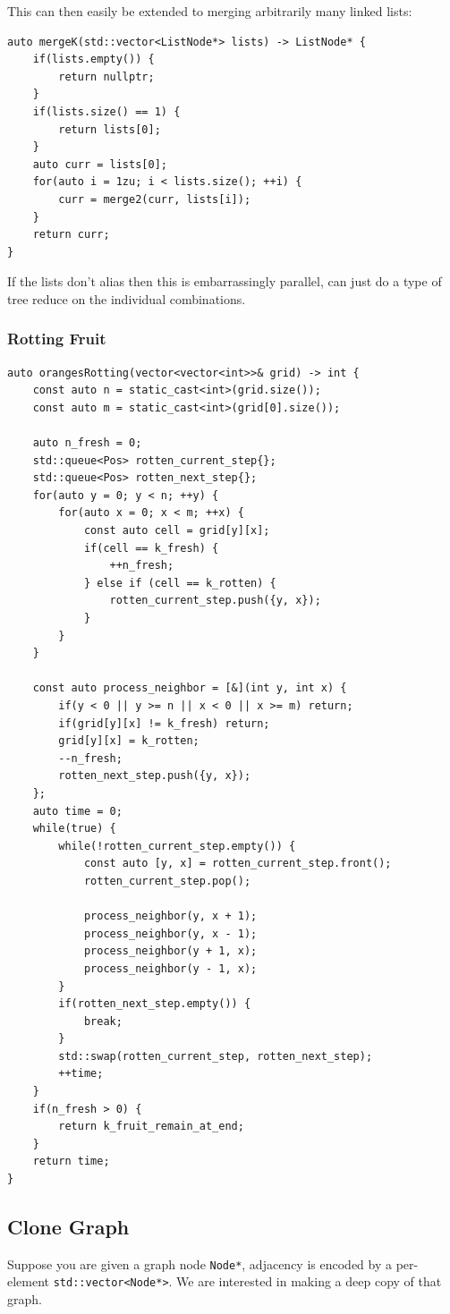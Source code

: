 \documentclass{article}
\begin{document}
This can then easily be extended to merging arbitrarily many linked lists:
\begin{lstlisting}
auto mergeK(std::vector<ListNode*> lists) -> ListNode* {
    if(lists.empty()) {
        return nullptr;
    }
    if(lists.size() == 1) {
        return lists[0];
    }
    auto curr = lists[0];
    for(auto i = 1zu; i < lists.size(); ++i) {
        curr = merge2(curr, lists[i]);
    }
    return curr;
}
\end{lstlisting}
If the lists don't alias then this is embarrassingly parallel, can just do a type of tree reduce on the individual combinations.

\subsubsection{Rotting Fruit}
\begin{lstlisting}
auto orangesRotting(vector<vector<int>>& grid) -> int {
    const auto n = static_cast<int>(grid.size());
    const auto m = static_cast<int>(grid[0].size());

    auto n_fresh = 0;
    std::queue<Pos> rotten_current_step{};
    std::queue<Pos> rotten_next_step{};
    for(auto y = 0; y < n; ++y) {
        for(auto x = 0; x < m; ++x) {
            const auto cell = grid[y][x];
            if(cell == k_fresh) {
                ++n_fresh;
            } else if (cell == k_rotten) {
                rotten_current_step.push({y, x});
            }
        }
    }

    const auto process_neighbor = [&](int y, int x) {
        if(y < 0 || y >= n || x < 0 || x >= m) return;
        if(grid[y][x] != k_fresh) return;
        grid[y][x] = k_rotten;
        --n_fresh;
        rotten_next_step.push({y, x});
    };
    auto time = 0;
    while(true) {
        while(!rotten_current_step.empty()) {
            const auto [y, x] = rotten_current_step.front();
            rotten_current_step.pop();

            process_neighbor(y, x + 1);
            process_neighbor(y, x - 1);
            process_neighbor(y + 1, x);
            process_neighbor(y - 1, x);
        }
        if(rotten_next_step.empty()) {
            break;
        }
        std::swap(rotten_current_step, rotten_next_step);
        ++time;
    }
    if(n_fresh > 0) {
        return k_fruit_remain_at_end;
    }
    return time;
}
\end{lstlisting}


\subsection{Clone Graph}
Suppose you are given a graph node \texttt{Node*}, adjacency is encoded by a per-element \texttt{std::vector<Node*>}. We are interested in making a deep copy of that graph.
\end{document}

